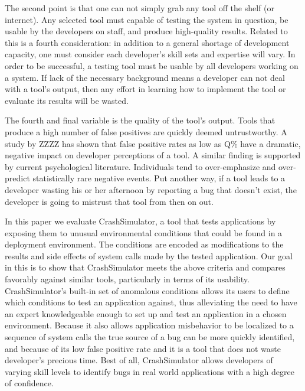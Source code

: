 
The second point is that one can not simply grab any tool off the shelf (or
internet).  Any selected tool must capable of testing the system in
question, be usable by the developers on staff, and produce
high-quality results.  Related to this is a fourth consideration: in
addition to a general shortage of development capacity, one must consider
each developer's skill sets and expertise will vary.
In order to be successful, a
testing tool must be usable by all developers working on a system. If
lack of the necessary background means a developer can not
deal with a tool's output,
then any effort in learning how to implement the tool or  evaluate its
results will be wasted.

The fourth and final variable is the quality of the tool's output.  Tools
that produce a high number of false positives are quickly deemed
untrustworthy.  A study by ZZZZ has shown that false positive rates as low
as Q\% have a dramatic, negative impact on developer perceptions of a tool.
  A similar finding is supported by current psychological
literature.  Individuals tend to over-emphasize and over-predict
statistically rare negative events.  Put another way, if a
tool leads to a developer wasting his or her afternoon by reporting a bug
that doesn't exist, the developer is going to mistrust that tool from then
on out.


In this paper we evaluate CrashSimulator, a tool that tests applications by
exposing them to unusual environmental conditions
that could be found in a deployment environment.  The conditions are
encoded as modifications to the results and side effects of system calls
made by the tested application.
Our goal in this is to show that CrashSimulator meets the above
criteria and compares favorably against similar tools, particularly in
terms of its usability.  CrashSimulator's
built-in set of anomalous conditions allows its users to define which
conditions to test an application against, thus alleviating the need to
have an expert knowledgeable enough to set up and test an application in a
chosen environment.  Because it also allows
application misbehavior to be localized
to a sequence of system calls the true source of a bug can be more
quickly identified,
and because of its low false positive rate and it
is a tool that does not waste developer's precious time.
Best of all, CrashSimulator allows developers of varying skill levels to
identify bugs in real world applications with a high degree of confidence.

